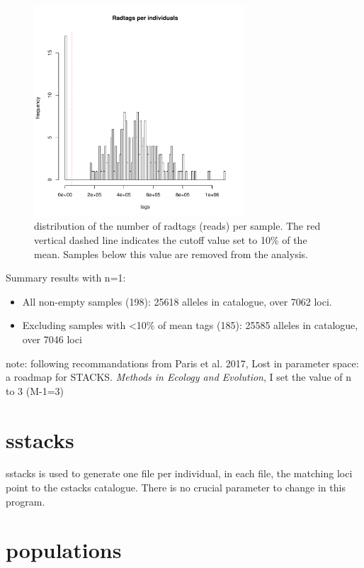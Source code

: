 \documentclass[10pt,a4paper]{report}
\begin{document}
\begin{figure}[h]
	\begin{center}
		\includegraphics[width=0.7\textwidth]{stacks_pipeline/radtags_distrib.pdf}
		\caption{distribution of the number of radtags (reads) per sample. The red vertical dashed line indicates the cutoff value set to 10\% of the mean. Samples below this value are removed from the analysis.}
		\label{tags_dist}
	\end{center}
\end{figure}
\FloatBarrier
Summary results with n=1:
\begin{itemize}
\item All non-empty samples (198): 25618 alleles in catalogue, over 7062 loci.
\item Excluding samples with \textless 10\% of mean tags (185): 25585 alleles in catalogue, over 7046 loci
\end{itemize}

note: following recommandations from Paris et al. 2017, Lost in parameter space: a roadmap for STACKS. \textit{Methods in Ecology and Evolution}, I set the value of n to 3 (M-1=3)

\section{sstacks}

sstacks is used to generate one file per individual, in each file, the matching loci point to the cstacks catalogue. There is no crucial parameter to change in this program.

\section{populations}
\end{document}
